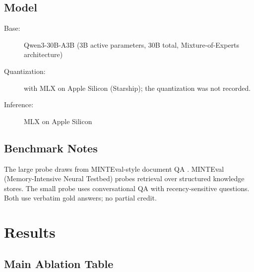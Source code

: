 \documentclass[11pt,a4paper]{article}
\begin{document}
\subsection{Model}

\begin{description}
  \item[Base:] Qwen3-30B-A3B (3B active parameters, 30B total, Mixture-of-Experts architecture)
  \item[Quantization:] with MLX on Apple Silicon (Starship); the quantization was not recorded.
  \item[Inference:] MLX on Apple Silicon
\end{description}

\subsection{Benchmark Notes}

The large probe draws from MINTEval-style document QA \cite{minteval}. MINTEval (Memory-Intensive Neural Testbed) probes retrieval over structured knowledge stores. The small probe uses conversational QA with recency-sensitive questions. Both use verbatim gold answers; no partial credit.

\section{Results}

\subsection{Main Ablation Table}

\begin{table}[H]
\centering
\caption{Main ablation results. Bold indicates best performance in column. Each row reflects the cumulative stack from the row above plus the named component.}
\label{tab:ablation}
\end{table}
\end{document}

